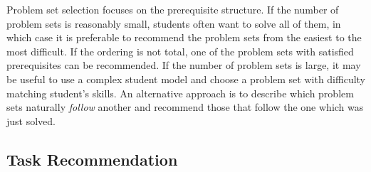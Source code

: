 
Problem set selection focuses on the prerequisite structure.
If the number of problem sets is reasonably small, students often want
to solve all of them, in which case it is preferable to recommend the problem
sets from the easiest to the most difficult.
If the ordering is not total, one of the problem sets with satisfied prerequisites
can be recommended.
If the number of problem sets is large, it may be useful to use a complex student model
and choose a problem set with difficulty matching student's skills.
An alternative approach is to describe which problem sets naturally \emph{follow} another
and recommend those that follow the one which was just solved.


\subsection{Task Recommendation}  %
\label{sec:task-recommendation}


